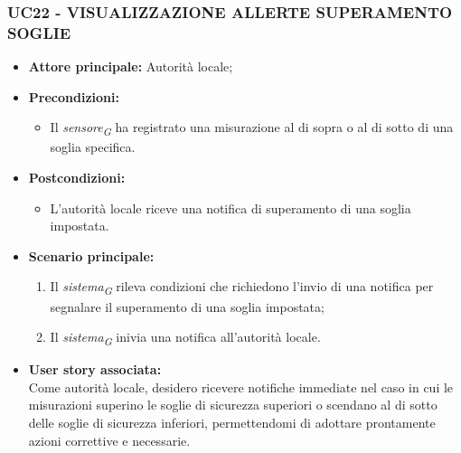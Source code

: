 \subsubsection{UC22 - VISUALIZZAZIONE ALLERTE SUPERAMENTO SOGLIE}
\begin{itemize}
      \item \textbf{Attore principale:} Autorità locale;
      \item \textbf{Precondizioni:}
            \begin{itemize}
                  \item Il \textit{sensore}\textsubscript{\textit{G}} ha registrato una misurazione al di sopra o al di sotto di una soglia specifica.
            \end{itemize}
      \item \textbf{Postcondizioni:}
            \begin{itemize}
                  \item  L'autorità locale riceve una notifica di superamento di una soglia impostata.
            \end{itemize}
      \item \textbf{Scenario principale:}
            \begin{enumerate}
                  \item  Il \textit{sistema}\textsubscript{\textit{G}} rileva condizioni che richiedono l'invio di una notifica per segnalare il superamento di una soglia impostata;
                  \item Il \textit{sistema}\textsubscript{\textit{G}} inivia una notifica all'autorità locale.
            \end{enumerate}
      \item \textbf{User story associata:} \\
      Come autorità locale, desidero ricevere notifiche immediate nel caso in cui le misurazioni superino le soglie di sicurezza superiori o scendano al di sotto delle soglie di sicurezza inferiori, permettendomi di adottare prontamente azioni correttive e necessarie.
\end{itemize}